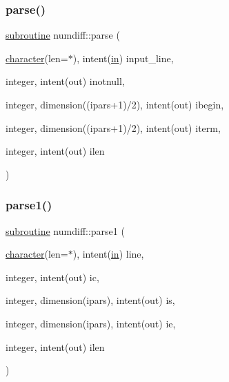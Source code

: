 \mbox{\label{numdiff_8f90_a78c07a4665edf04b67eaeeb072b4e115}} 
\subsubsection{\texorpdfstring{parse()}{parse()}}
{\footnotesize\ttfamily \hyperlink{M__stopwatch_83_8txt_acfbcff50169d691ff02d4a123ed70482}{subroutine} numdiff\+::parse (\begin{DoxyParamCaption}\item[{\hyperlink{option__stopwatch_83_8txt_abd4b21fbbd175834027b5224bfe97e66}{character}(len=$\ast$), intent(\hyperlink{M__journal_83_8txt_afce72651d1eed785a2132bee863b2f38}{in})}]{input\+\_\+line,  }\item[{integer, intent(out)}]{inotnull,  }\item[{integer, dimension((ipars+1)/2), intent(out)}]{ibegin,  }\item[{integer, dimension((ipars+1)/2), intent(out)}]{iterm,  }\item[{integer, intent(out)}]{ilen }\end{DoxyParamCaption})}

\mbox{\label{numdiff_8f90_aeee37c7b0374de09f2c99faac68f1bd5}} 
\subsubsection{\texorpdfstring{parse1()}{parse1()}}
{\footnotesize\ttfamily \hyperlink{M__stopwatch_83_8txt_acfbcff50169d691ff02d4a123ed70482}{subroutine} numdiff\+::parse1 (\begin{DoxyParamCaption}\item[{\hyperlink{option__stopwatch_83_8txt_abd4b21fbbd175834027b5224bfe97e66}{character}(len=$\ast$), intent(\hyperlink{M__journal_83_8txt_afce72651d1eed785a2132bee863b2f38}{in})}]{line,  }\item[{integer, intent(out)}]{ic,  }\item[{integer, dimension(ipars), intent(out)}]{is,  }\item[{integer, dimension(ipars), intent(out)}]{ie,  }\item[{integer, intent(out)}]{ilen }\end{DoxyParamCaption})}

